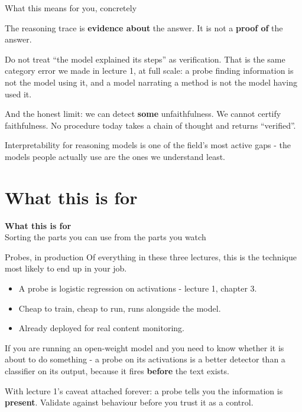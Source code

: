 \documentclass[aspectratio=169]{beamer}
\newcommand{\keybox}[1]{%
  \begin{tcolorbox}[colback=armblue!8, colframe=armblue, boxrule=0.6pt, arc=2pt]
  #1
  \end{tcolorbox}}
\newcommand{\takebox}[1]{%
  \begin{tcolorbox}[colback=paramgreen!8, colframe=paramgreen, boxrule=0.6pt, arc=2pt]
  #1
  \end{tcolorbox}}
\newcommand{\watchbox}[1]{%
  \begin{tcolorbox}[colback=armorange!12, colframe=armorange, boxrule=0.6pt, arc=2pt]
  #1
  \end{tcolorbox}}
\newcommand{\sectiontransition}[2]{%
  \begin{frame}[plain]
    \vfill
    \begin{center}
      {\Huge\bfseries\color{popblue} #1}\\[1.1em]
      {\large #2}
    \end{center}
    \vfill
  \end{frame}}
\begin{document}
\begin{frame}{What this means for you, concretely}
  \vspace{0.9em}
  \takebox{The reasoning trace is \textbf{evidence about} the answer. It is not a
  \textbf{proof of} the answer.}

  \vspace{1.0em}
  Do not treat ``the model explained its steps'' as verification. That is the same category error
  we made in lecture 1, at full scale: a probe finding information is not the model using it, and
  a model narrating a method is not the model having used it.

  \vspace{0.7em}
  \watchbox{\small And the honest limit: we can detect \textbf{some} unfaithfulness. We cannot
  certify faithfulness. No procedure today takes a chain of thought and returns ``verified''.}

  \vspace{0.3em}
  {\footnotesize Interpretability for reasoning models is one of the field's most active gaps -
  the models people actually use are the ones we understand least.}
\end{frame}

\section{What this is for}
\sectiontransition{What this is for}{Sorting the parts you can use from the parts you watch}

\begin{frame}{Probes, in production}
  \vspace{0.8em}
  Of everything in these three lectures, this is the technique most likely to end up in your job.

  \vspace{0.7em}
  \begin{itemize}
    \item A probe is logistic regression on activations - lecture 1, chapter 3.
    \item Cheap to train, cheap to run, runs alongside the model.
    \item Already deployed for real content monitoring.
  \end{itemize}

  \vspace{0.9em}
  \keybox{If you are running an open-weight model and you need to know whether it is about to do
  something - a probe on its activations is a better detector than a classifier on its output,
  because it fires \textbf{before} the text exists.}

  \vspace{0.6em}
  \watchbox{With lecture 1's caveat attached forever: a probe tells you the information is
  \textbf{present}. Validate against behaviour before you trust it as a control.}
\end{frame}
\end{document}
